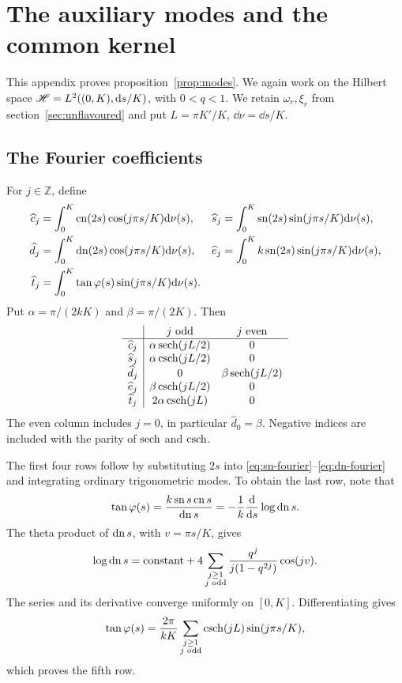\section{The auxiliary modes and the common kernel}
\label{app:darboux}
This appendix proves proposition~\ref{prop:modes}. We again work on the Hilbert
space $\mathscr H=L^2((0,K),\mathrm d s/K)$, with $0<q<1$.
We retain $\omega_r,\xi_r$ from section~\ref{sec:unflavoured}
and put $L=\pi K'/K$, $\dd\nu=\dd s/K$.

\subsection{The Fourier coefficients}
For $j\in\mathbb Z$, define
\begin{equation}
  \begin{aligned}
    \widehat c_j&=\int_0^K\operatorname{cn}(2s)\cos(j\pi s/K)\mathrm d\nu(s),&
    \widehat s_j&=\int_0^K\operatorname{sn}(2s)\sin(j\pi s/K)\mathrm d\nu(s),\\
    \widehat d_j&=\int_0^K\operatorname{dn}(2s)\cos(j\pi s/K)\mathrm d\nu(s),&
    \widehat e_j&=\int_0^K k\operatorname{sn}(2s)\sin(j\pi s/K)\mathrm d\nu(s),\\
    \widehat t_j&=\int_0^K\tan\varphi(s)\sin(j\pi s/K)\mathrm d\nu(s).
  \end{aligned}
  \label{eq:fourier-coefficients}
\end{equation}
Put $\alpha=\pi/(2kK)$ and $\beta=\pi/(2K)$. Then
\begin{equation}
  \begin{array}{c|cc}
    &j\text{ odd}&j\text{ even}\\\hline
    \widehat c_j&\alpha\operatorname{sech}(jL/2)&0\\
    \widehat s_j&\alpha\operatorname{csch}(jL/2)&0\\
    \widehat d_j&0&\beta\operatorname{sech}(jL/2)\\
    \widehat e_j&\beta\operatorname{csch}(jL/2)&0\\
    \widehat t_j&2\alpha\operatorname{csch}(jL)&0
  \end{array}
  \label{eq:fourier-table}
\end{equation}
The even column includes $j=0$, in particular $\widehat d_0=\beta$. Negative
indices are included with the parity of $\operatorname{sech}$ and $\operatorname{csch}$.

The first four rows follow by substituting $2s$ into
\eqref{eq:sn-fourier}--\eqref{eq:dn-fourier} and integrating ordinary
trigonometric modes. To obtain the last row, note that
\begin{equation}
  \tan\varphi(s)=\frac{k\operatorname{sn} s\operatorname{cn} s}{\operatorname{dn} s}
  =-\frac1k\frac{\mathrm d}{\mathrm d s}\log\operatorname{dn} s.
\end{equation}
The theta product of $\operatorname{dn} s$, with $v=\pi s/K$, gives
\begin{equation}
  \log\operatorname{dn} s=\text{constant}
  +4\sum_{\substack{j\geq1\\j\text{ odd}}}
  \frac{q^j}{j(1-q^{2j})}\cos(jv).
\end{equation}
The series and its derivative converge uniformly on $[0,K]$. Differentiating
gives
\begin{equation}
  \tan\varphi(s)=\frac{2\pi}{kK}
  \sum_{\substack{j\geq1\\j\text{ odd}}}\operatorname{csch}(jL)\sin(j\pi s/K),
\end{equation}
which proves the fifth row.

